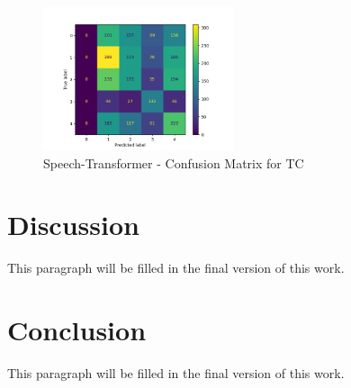 \documentclass[conference]{IEEEtran}
\begin{document}
\begin{figure}[hbtp]
    \centerline{\includegraphics[width=0.5\textwidth]{Figures/Fig_STTC.png}}
    \caption{Speech-Transformer - Confusion Matrix for TC}
    \label{fig_STTC}
\end{figure}

\section{Discussion}
This paragraph will be filled in the final version of this work.

\section{Conclusion}
This paragraph will be filled in the final version of this work.
\end{document}
